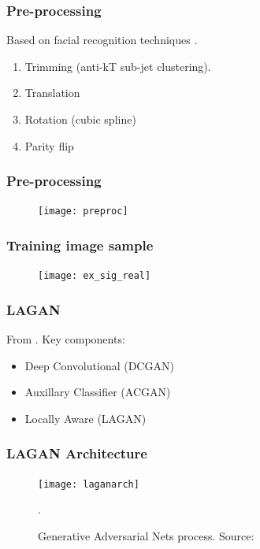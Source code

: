 \documentclass{beamer}
\begin{document}
		\begin{frame}
			\frametitle{Pre-processing}
			Based on facial recognition techniques \textit{\cite{cogan2014jet}}.
			\begin{enumerate}
				\item Trimming (anti-kT sub-jet clustering).
				\item Translation
				\item Rotation (cubic spline)
				\item Parity flip
			\end{enumerate}
		\end{frame}
		\begin{frame}
			\frametitle{Pre-processing}
			\begin{figure}[H]
				\centering
				\texttt{[image: preproc]}
			
				\label{fig:preproc}
				
			\end{figure}
		\end{frame}
	
		\begin{frame}
			\frametitle{Training image sample}
			\begin{figure}[H]
				\centering
				\texttt{[image: ex\_sig\_real]}
				
				\label{fig:ex_sig_real}
				
			\end{figure}
		\end{frame}
	
		\begin{frame}
			\frametitle{LAGAN}
			From \textit{\cite{de2017learning}}. Key components:
			\begin{itemize}
				\item Deep Convolutional (DCGAN) \textit{\autocite{Radford2015}}
				\item Auxillary Classifier (ACGAN) \textit{\autocite{odena2016conditional}}
				\item Locally Aware (LAGAN)
			\end{itemize}
			
		\end{frame}
	
		\begin{frame}
			\frametitle{LAGAN Architecture}
			\begin{figure}[H]
				\centering
				\texttt{[image: laganarch]}
				
				\caption{Generative Adversarial Nets process. Source: \textit{\cite{de2017learning}}}.
				\label{fig:lagan}
				
			\end{figure}
			
		\end{frame}
\end{document}
